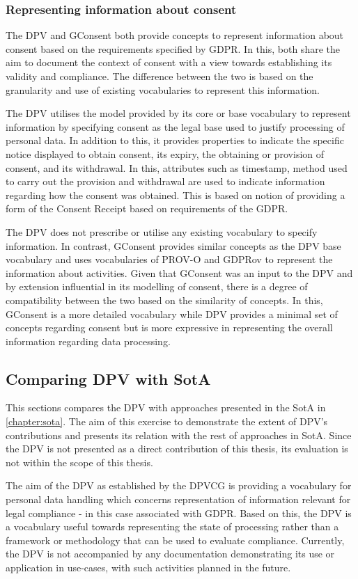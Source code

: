 \subsubsection{Representing information about consent}
The DPV and GConsent both provide concepts to represent information about consent based on the requirements specified by GDPR.
In this, both share the aim to document the context of consent with a view towards establishing its validity and compliance.
The difference between the two is based on the granularity and use of existing vocabularies to represent this information.

The DPV utilises the model provided by its core or base vocabulary to represent information by specifying consent as the legal base used to justify processing of personal data.
In addition to this, it provides properties to indicate the specific notice displayed to obtain consent, its expiry, the obtaining or provision of consent, and its withdrawal.
In this, attributes such as timestamp, method used to carry out the provision and withdrawal are used to indicate information regarding how the consent was obtained.
This is based on notion of providing a form of the Consent Receipt based on requirements of the GDPR.

The DPV does not prescribe or utilise any existing vocabulary to specify information.
In contrast, GConsent provides similar concepts as the DPV base vocabulary and uses vocabularies of PROV-O and GDPRov to represent the information about activities.
Given that GConsent was an input to the DPV and by extension influential in its modelling of consent, there is a degree of compatibility between the two based on the similarity of concepts.
In this, GConsent is a more detailed vocabulary while DPV provides a minimal set of concepts regarding consent but is more expressive in representing the overall information regarding data processing.

\subsection{Comparing DPV with SotA}\label{sec:voc:dpv-sota}
This sections compares the DPV with approaches presented in the SotA in \autoref{chapter:sota}.
The aim of this exercise to demonstrate the extent of DPV's contributions and presents its relation with the rest of approaches in SotA.
Since the DPV is not presented as a direct contribution of this thesis, its evaluation is not within the scope of this thesis.

The aim of the DPV as established by the DPVCG is providing a vocabulary for personal data handling which concerns representation of information relevant for legal compliance - in this case associated with GDPR. Based on this, the DPV is a vocabulary useful towards representing the state of processing rather than a framework or methodology that can be used to evaluate compliance.
Currently, the DPV is not accompanied by any documentation demonstrating its use or application in use-cases, with such activities planned in the future.

